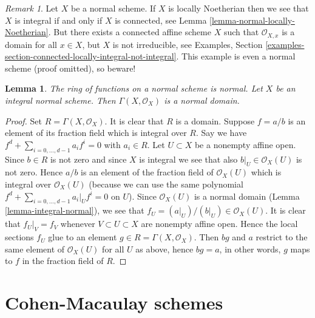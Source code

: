 \documentclass{stacks-project}
\newenvironment{slogan}{\comment}{\endcomment}
\theoremstyle{plain}
\newtheorem{lemma}[subsection]{Lemma}
\theoremstyle{definition}
\theoremstyle{remark}
\newtheorem{remark}[subsection]{Remark}
\numberwithin{equation}{subsection}
\begin{document}
\begin{remark}
\label{remark-normal-connected-irreducible}
Let $X$ be a normal scheme. If $X$ is locally Noetherian then we see that
$X$ is integral if and only if $X$ is connected, see
Lemma \ref{lemma-normal-locally-Noetherian}.
But there exists a connected affine scheme $X$ such that
$\mathcal{O}_{X, x}$ is a domain for all $x \in X$, but $X$ is not
irreducible, see Examples, Section
\ref{examples-section-connected-locally-integral-not-integral}.
This example is even a normal scheme (proof omitted), so beware!
\end{remark}

\begin{lemma}
\label{lemma-normal-integral-sections}
\begin{slogan}
The ring of functions on a normal scheme is normal.
\end{slogan}
Let $X$ be an integral normal scheme.
Then $\Gamma(X, \mathcal{O}_X)$ is a normal domain.
\end{lemma}

\begin{proof}
Set $R = \Gamma(X, \mathcal{O}_X)$.
It is clear that $R$ is a domain.
Suppose $f = a/b$ is an element of its fraction field
which is integral over $R$. Say we have
$f^d + \sum_{i = 0, \ldots, d - 1} a_i f^i = 0$ with
$a_i \in R$. Let $U \subset X$ be a nonempty affine open.
Since $b \in R$ is not zero and since $X$ is integral we see
that also $b|_U \in \mathcal{O}_X(U)$ is not zero.
Hence $a/b$ is an element of the fraction field of
$\mathcal{O}_X(U)$ which is integral over $\mathcal{O}_X(U)$
(because we can use the same polynomial
$f^d + \sum_{i = 0, \ldots, d - 1} a_i|_U f^i = 0$ on $U$).
Since $\mathcal{O}_X(U)$ is a normal domain
(Lemma \ref{lemma-integral-normal}), we see that
$f_U = (a|_U)/(b|_U) \in \mathcal{O}_X(U)$. It is clear
that $f_U|_V = f_V$ whenever $V \subset U \subset X$ are
nonempty affine open. Hence the local sections $f_U$ glue to an element
$g \in R = \Gamma(X, \mathcal{O}_X)$. Then $bg$ and $a$
restrict to the same element of $\mathcal{O}_X(U)$ for
all $U$ as above, hence $bg = a$, in other words, $g$ maps to $f$
in the fraction field of $R$.
\end{proof}










\section{Cohen-Macaulay schemes}
\label{section-Cohen-Macaulay}
\end{document}
